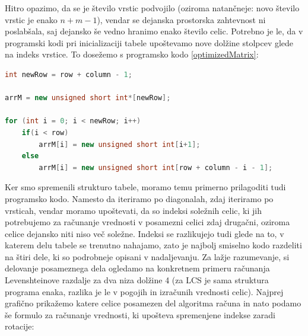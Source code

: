 \documentclass[a4paper,12pt,openright]{book}
\begin{document}
Hitro opazimo, da se je število vrstic podvojilo (oziroma natančneje: novo število vrstic je enako $n+m-1$), vendar se dejanska prostorska zahtevnost ni poslabšala, saj dejansko še vedno hranimo enako število celic. Potrebno je le, da v programski kodi pri inicializaciji tabele upoštevamo nove dolžine stolpcev glede na indeks vrstice. To dosežemo s programsko kodo \ref{optimizedMatrix}: 

\bigskip
\bigskip

\begin{lstlisting}[language=C++, caption={Inicializacija optimizirane tabele}, captionpos=b, label=optimizedMatrix]
int newRow = row + column - 1;

arrM = new unsigned short int*[newRow];

for (int i = 0; i < newRow; i++) 
    if(i < row)
        arrM[i] = new unsigned short int[i+1];
    else
        arrM[i] = new unsigned short int[row + column - i - 1];
\end{lstlisting}

\bigskip
\bigskip

Ker smo spremenili strukturo tabele, moramo temu primerno prilagoditi tudi programsko kodo. Namesto da iteriramo po diagonalah, zdaj iteriramo po vrsticah, vendar moramo upoštevati, da so indeksi soležnih celic, ki jih potrebujemo za računanje vrednosti v posamezni celici zdaj drugačni, oziroma celice dejansko niti niso več soležne. Indeksi se razlikujejo tudi glede na to, v katerem delu tabele se trenutno nahajamo, zato je najbolj smiselno kodo razdeliti na štiri dele, ki so podrobneje opisani v nadaljevanju. Za lažje razumevanje, si delovanje posameznega dela ogledamo na konkretnem primeru računanja Levenshteinove razdalje za dva niza dolžine 4 (za LCS je sama struktura programa enaka, razlika je le v pogojih in izračunih vrednosti celic). Najprej grafično prikažemo katere celice posamezen del algoritma računa in nato podamo še formulo za računanje vrednosti, ki upošteva spremenjene indekse zaradi rotacije: 
\end{document}
